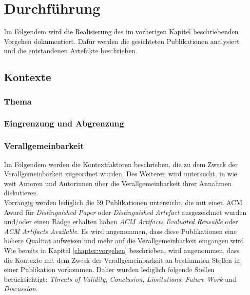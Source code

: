 \chapter{Durchführung}
\label{chapter:impl}
Im Folgendem wird die Realisierung des im vorherigen Kapitel beschriebenden Vorgehen dokumentiert. Dafür werden die gesichteten Publikationen analysiert und die entstandenen Artefakte beschrieben.

\section{Kontexte}

\subsection{Thema}

\subsection{Eingrenzung und Abgrenzung}

\clearpage
\subsection{Verallgemeinbarkeit}

Im Folgendem werden die Kontextfaktoren beschrieben,
die zu dem Zweck der Verallgemeinbarkeit zugeordnet wurden.
Des Weiteren wird untersucht, in wie weit Autoren und Autorinnen über die Verallgemeinbarkeit ihrer Annahmen diskutieren. \\

Vorrangig werden lediglich die 59 Publikationen untersucht,
die mit einen ACM Award für \textit{Distinguished Paper} oder \textit{Distinguished Artefact} ausgezeichnet wurden und/oder einen Badge erhalten haben \textit{ACM Artifacts Evaluated Reusable} oder \textit{ACM Artifacts Available}. Es wird angenommen, dass diese Publikationen eine höhere Qualität aufweisen und mehr auf die Verallgemeinbarkeit eingangen wird. \\

Wie bereits in Kapitel \ref{chapter:vorgehen} beschrieben, wird angenommen, dass die Kontexte mit dem Zweck der Verallgemeinbarkeit
an bestimmten Stellen in einer Publikation vorkommen. Daher wurden lediglich folgende Stellen berücksichtigt: \textit{Threats of Validity}, \textit{Conclusion}, \textit{Limitations}, \textit{Future Work} und \textit{Discussion}. \\

